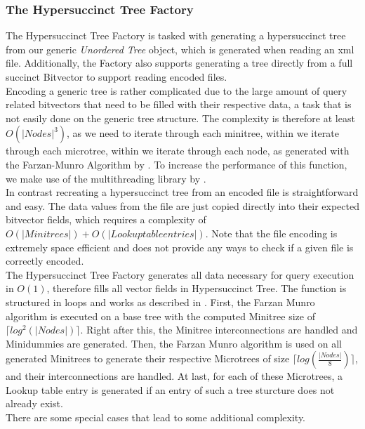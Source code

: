 \documentclass{article}
\begin{document}
\subsubsection{The Hypersuccinct Tree Factory}
The Hypersuccinct Tree Factory is tasked with generating a hypersuccinct tree from our generic \textit{Unordered Tree} object, which is generated when reading an xml file. Additionally, the Factory also supports generating a tree directly from a full succinct Bitvector to support reading encoded files.\\
Encoding a generic tree is rather complicated due to the large amount of query related bitvectors that need to be filled with their respective data, a task that is not easily done on the generic tree structure. The complexity is therefore at least $O(|Nodes|^3)$, as we need to iterate through each minitree, within we iterate through each microtree, within we iterate through each node, as generated with the Farzan-Munro Algorithm by \cite{farzanMunro}. To increase the performance of this function, we make use of the multithreading library by \cite{threading}.\\
In contrast recreating a hypersuccinct tree from an encoded file is straightforward and easy. The data values from the file are just copied directly into their expected bitvector fields, which requires a complexity of $O(|Minitrees|) + O(|Lookup table entries|)$. Note that the file encoding is extremely space efficient and does not provide any ways to check if a given file is correctly encoded.\\
The Hypersuccinct Tree Factory generates all data necessary for query execution in $O(1)$, therefore fills all vector fields in Hypersuccinct Tree. The function is structured in loops and works as described in \cite{farzanMunro}. First, the Farzan Munro algorithm is executed on a base tree with the computed Minitree size of $\lceil log^2( |Nodes| ) \rceil$. Right after this, the Minitree interconnections are handled and Minidummies are generated. Then, the Farzan Munro algorithm is used on all generated Minitrees to generate their respective Microtrees of size $\lceil log( \frac{|Nodes|}{8} ) \rceil$, and their interconnections are handled. At last, for each of these Microtrees, a Lookup table entry is generated if an entry of such a tree sturcture does not already exist.\\
There are some special cases that lead to some additional complexity.
\end{document}
